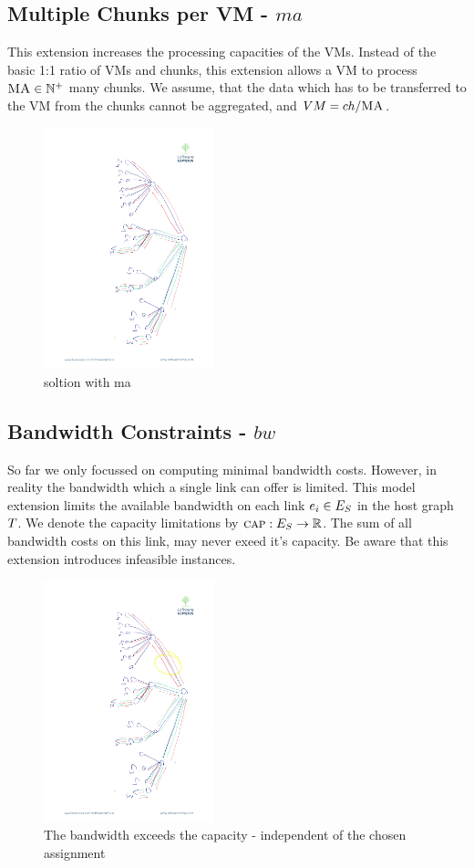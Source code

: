 \subsection{Multiple Chunks per VM - $ma$}

This extension increases the processing capacities of the VMs. Instead of the 
basic 1:1 ratio of VMs and chunks, this extension allows a VM to process 
$\textsc{MA} \in \mathbb{N}^+$ many chunks. We assume, that the data which has to 
be transferred to the VM from the chunks cannot be aggregated, and $VM = 
ch / \textsc{MA}$.

\begin{figure}
 
\includegraphics[angle=90,origin=c, height=7cm]{figs/model_fig_skteches/ma_r_cv}
\caption{soltion with ma}
\end{figure}

\subsection{Bandwidth Constraints - $bw$}

So far we only focussed on computing minimal bandwidth costs. However, in 
reality the bandwidth which a single link can offer is limited. This model 
extension limits the available bandwidth on each link $e_i \in 
E_S$ in the host graph $T$. We denote the capacity limitations 
by $\textsc{cap} : E_S \rightarrow \mathbb{R}$. The sum of all 
bandwidth costs on this link, may never exeed it's capacity. Be aware that 
this extension introduces infeasible instances.

\begin{figure}
 
\includegraphics[angle=90,origin=c, height=7cm]{figs/model_fig_skteches/bw_ma_r_cv}
\caption{The bandwidth exceeds the capacity - independent of the chosen assignment}
\end{figure}
